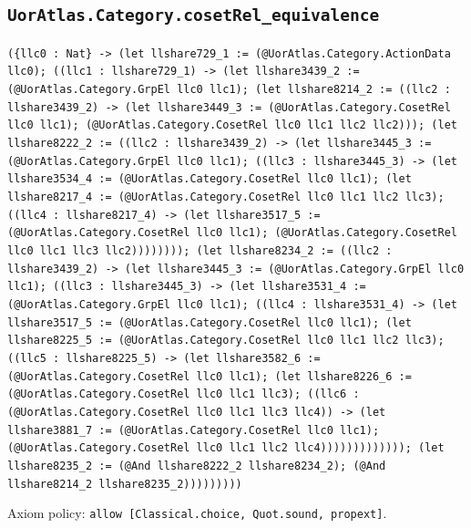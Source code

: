 \documentclass[11pt]{article}
\begin{document}
\subsection*{\texttt{UorAtlas.Category.cosetRel\_equivalence}}
\noindent\texttt{(\{llc0 : Nat\} -> (let llshare729\_1 := (@UorAtlas.Category.ActionData llc0); ((llc1 : llshare729\_1) -> (let llshare3439\_2 := (@UorAtlas.Category.GrpEl llc0 llc1); (let llshare8214\_2 := ((llc2 : llshare3439\_2) -> (let llshare3449\_3 := (@UorAtlas.Category.CosetRel llc0 llc1); (@UorAtlas.Category.CosetRel llc0 llc1 llc2 llc2))); (let llshare8222\_2 := ((llc2 : llshare3439\_2) -> (let llshare3445\_3 := (@UorAtlas.Category.GrpEl llc0 llc1); ((llc3 : llshare3445\_3) -> (let llshare3534\_4 := (@UorAtlas.Category.CosetRel llc0 llc1); (let llshare8217\_4 := (@UorAtlas.Category.CosetRel llc0 llc1 llc2 llc3); ((llc4 : llshare8217\_4) -> (let llshare3517\_5 := (@UorAtlas.Category.CosetRel llc0 llc1); (@UorAtlas.Category.CosetRel llc0 llc1 llc3 llc2)))))))); (let llshare8234\_2 := ((llc2 : llshare3439\_2) -> (let llshare3445\_3 := (@UorAtlas.Category.GrpEl llc0 llc1); ((llc3 : llshare3445\_3) -> (let llshare3531\_4 := (@UorAtlas.Category.GrpEl llc0 llc1); ((llc4 : llshare3531\_4) -> (let llshare3517\_5 := (@UorAtlas.Category.CosetRel llc0 llc1); (let llshare8225\_5 := (@UorAtlas.Category.CosetRel llc0 llc1 llc2 llc3); ((llc5 : llshare8225\_5) -> (let llshare3582\_6 := (@UorAtlas.Category.CosetRel llc0 llc1); (let llshare8226\_6 := (@UorAtlas.Category.CosetRel llc0 llc1 llc3); ((llc6 : (@UorAtlas.Category.CosetRel llc0 llc1 llc3 llc4)) -> (let llshare3881\_7 := (@UorAtlas.Category.CosetRel llc0 llc1); (@UorAtlas.Category.CosetRel llc0 llc1 llc2 llc4))))))))))))); (let llshare8235\_2 := (@And llshare8222\_2 llshare8234\_2); (@And llshare8214\_2 llshare8235\_2)))))))))}\par
\noindent Axiom policy: \texttt{allow [Classical.choice, Quot.sound, propext]}.\par
\end{document}
